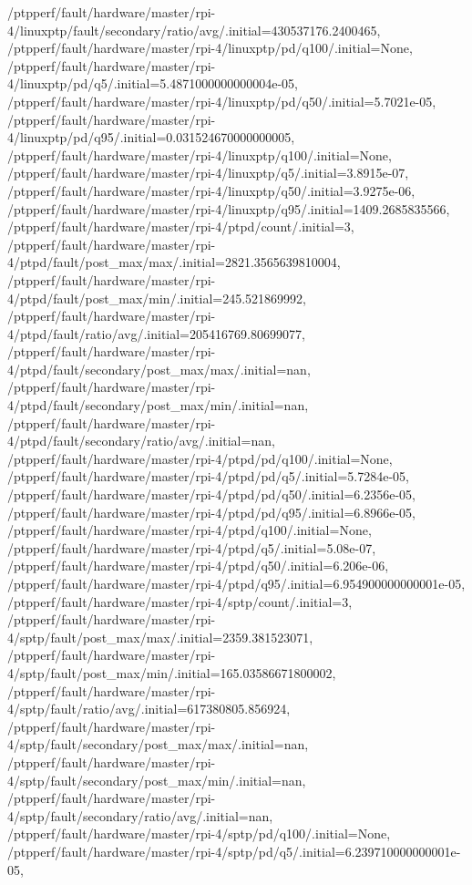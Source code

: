{    /ptpperf/fault/hardware/master/rpi-4/linuxptp/fault/secondary/ratio/avg/.initial=430537176.2400465,
    /ptpperf/fault/hardware/master/rpi-4/linuxptp/pd/q100/.initial=None,
    /ptpperf/fault/hardware/master/rpi-4/linuxptp/pd/q5/.initial=5.4871000000000004e-05,
    /ptpperf/fault/hardware/master/rpi-4/linuxptp/pd/q50/.initial=5.7021e-05,
    /ptpperf/fault/hardware/master/rpi-4/linuxptp/pd/q95/.initial=0.031524670000000005,
    /ptpperf/fault/hardware/master/rpi-4/linuxptp/q100/.initial=None,
    /ptpperf/fault/hardware/master/rpi-4/linuxptp/q5/.initial=3.8915e-07,
    /ptpperf/fault/hardware/master/rpi-4/linuxptp/q50/.initial=3.9275e-06,
    /ptpperf/fault/hardware/master/rpi-4/linuxptp/q95/.initial=1409.2685835566,
    /ptpperf/fault/hardware/master/rpi-4/ptpd/count/.initial=3,
    /ptpperf/fault/hardware/master/rpi-4/ptpd/fault/post_max/max/.initial=2821.3565639810004,
    /ptpperf/fault/hardware/master/rpi-4/ptpd/fault/post_max/min/.initial=245.521869992,
    /ptpperf/fault/hardware/master/rpi-4/ptpd/fault/ratio/avg/.initial=205416769.80699077,
    /ptpperf/fault/hardware/master/rpi-4/ptpd/fault/secondary/post_max/max/.initial=nan,
    /ptpperf/fault/hardware/master/rpi-4/ptpd/fault/secondary/post_max/min/.initial=nan,
    /ptpperf/fault/hardware/master/rpi-4/ptpd/fault/secondary/ratio/avg/.initial=nan,
    /ptpperf/fault/hardware/master/rpi-4/ptpd/pd/q100/.initial=None,
    /ptpperf/fault/hardware/master/rpi-4/ptpd/pd/q5/.initial=5.7284e-05,
    /ptpperf/fault/hardware/master/rpi-4/ptpd/pd/q50/.initial=6.2356e-05,
    /ptpperf/fault/hardware/master/rpi-4/ptpd/pd/q95/.initial=6.8966e-05,
    /ptpperf/fault/hardware/master/rpi-4/ptpd/q100/.initial=None,
    /ptpperf/fault/hardware/master/rpi-4/ptpd/q5/.initial=5.08e-07,
    /ptpperf/fault/hardware/master/rpi-4/ptpd/q50/.initial=6.206e-06,
    /ptpperf/fault/hardware/master/rpi-4/ptpd/q95/.initial=6.954900000000001e-05,
    /ptpperf/fault/hardware/master/rpi-4/sptp/count/.initial=3,
    /ptpperf/fault/hardware/master/rpi-4/sptp/fault/post_max/max/.initial=2359.381523071,
    /ptpperf/fault/hardware/master/rpi-4/sptp/fault/post_max/min/.initial=165.03586671800002,
    /ptpperf/fault/hardware/master/rpi-4/sptp/fault/ratio/avg/.initial=617380805.856924,
    /ptpperf/fault/hardware/master/rpi-4/sptp/fault/secondary/post_max/max/.initial=nan,
    /ptpperf/fault/hardware/master/rpi-4/sptp/fault/secondary/post_max/min/.initial=nan,
    /ptpperf/fault/hardware/master/rpi-4/sptp/fault/secondary/ratio/avg/.initial=nan,
    /ptpperf/fault/hardware/master/rpi-4/sptp/pd/q100/.initial=None,
    /ptpperf/fault/hardware/master/rpi-4/sptp/pd/q5/.initial=6.239710000000001e-05,
}

